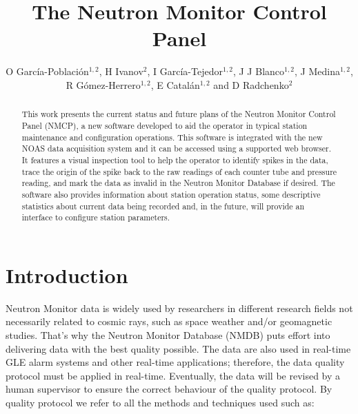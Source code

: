 \documentclass[a4paper]{jpconf}
\begin{document}
\title{The Neutron Monitor Control Panel}

\author{O García-Población$^{1,2}$, H Ivanov$^2$, I García-Tejedor$^{1,2}$,
J J Blanco$^{1,2}$, J Medina$^{1,2}$, R Gómez-Herrero$^{1,2}$, E
Catalán$^{1,2}$ and D Radchenko$^{2}$}

\address{$^1$ Space Research Group, University of Alcalá, Spain}
\address{$^2$ Castilla-La Mancha Neutron Monitor, Parque Tecnológico de Guadalajara, Spain}


\begin{abstract} 
    This work presents the current status and future plans of the
    Neutron Monitor Control Panel (NMCP), a new software developed to aid the
    operator in typical station maintenance and configuration operations. This
    software is integrated with the new NOAS data acquisition system and it can
    be accessed using a supported web browser. It features a visual inspection
    tool to help the operator to identify spikes in the data, trace the origin
    of the spike back to the raw readings of each counter tube and pressure
    reading, and mark the data as invalid in the Neutron Monitor Database if
    desired. The software also provides information about station operation
    status, some descriptive statistics about current data being recorded and,
    in the future, will provide an interface to configure station parameters.
\end{abstract}

\section{Introduction}

Neutron Monitor data is widely used by researchers in different research fields
not necessarily related to cosmic rays, such as space weather and/or geomagnetic
studies. That's why the Neutron Monitor Database (NMDB)\cite{NMDB2011} puts
effort into delivering data with the best quality possible. The data are also
used in real-time GLE alarm systems and other real-time applications; therefore,
the data quality protocol must be applied in real-time. Eventually, the data
will be revised by a human supervisor to ensure the correct behaviour of the
quality protocol. By quality protocol we refer to all the methods and techniques
used such as:
\end{document}
